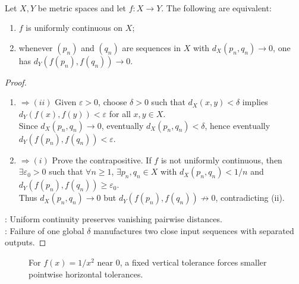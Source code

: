 \begin{proposition} \label{prop:uniform-continuity-sequential-test} \\
Let $X,Y$ be metric spaces and let $f:X\to Y$. The following are equivalent:
\begin{enumerate}[label=(\roman*)]
\setlength{\itemsep}{0pt}
\item $f$ is uniformly continuous on $X$;
\item whenever $(p_n)$ and $(q_n)$ are sequences in $X$ with $d_X(p_n,q_n)\to0$, one has $d_Y(f(p_n),f(q_n))\to0$.
\end{enumerate}
\begin{proof}
\begin{enumerate}[label=(\roman*).]
\setlength{\itemsep}{0pt}
\item[$(i)$]$\Rightarrow(ii)$ Given $\varepsilon>0$, choose $\delta>0$ such that $d_X(x,y)<\delta$ implies $d_Y(f(x),f(y))<\varepsilon$ for all $x,y\in X$.\\
Since $d_X(p_n,q_n)\to0$, eventually $d_X(p_n,q_n)<\delta$, hence eventually $d_Y(f(p_n),f(q_n))<\varepsilon$.
\item[$(ii)$]$\Rightarrow(i)$ Prove the contrapositive. If $f$ is not uniformly continuous, then $\exists \varepsilon_0>0$ such that $\forall n\geq1$, $\exists p_n,q_n\in X$ with $d_X(p_n,q_n)<1/n$ and $d_Y(f(p_n),f(q_n))\geq\varepsilon_0$.\\
Thus $d_X(p_n,q_n)\to0$ but $d_Y(f(p_n),f(q_n))\not\to0$, contradicting (ii).
\end{enumerate}
: Uniform continuity preserves vanishing pairwise distances.\\
: Failure of one global $\delta$ manufactures two close input sequences with separated outputs.
\end{proof}
\end{proposition}

\begin{figure}[H]
  \centering
  
  \caption{For $f(x)=1/x^2$ near $0$, a fixed vertical tolerance forces smaller pointwise horizontal tolerances.}
  \label{fig:uniform-continuity-delta-shrinks-one-over-x-squared}
\end{figure}

